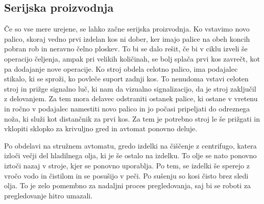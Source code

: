 \subsection{Serijska proizvodnja}
Če so vse mere urejene, se lahko začne serijska proizvodnja.
Ko vstavimo novo palico, skoraj vedno prvi izdelan kos ni dober,
ker imajo palice na obeh koncih pobran rob in neravno čelno ploskev.
To bi se dalo rešit, če bi v ciklu izveli še operacijo čeljenja,
ampak pri velikih količinah, se bolj splača prvi kos zavrečt,
kot pa dodajanje nove operacije. Ko stroj obdela celotno palico,
ima podajalec stikalo, ki se sproži, ko povleče suport zadnji
kos. To nenudoma vstavi celoten stroj in prižge signalno luč,
ki nam da vizualno signalizacijo, da je stroj zaključil z delovanjem.
Za tem mora delavec odstraniti ostanek palice, ki ostane v vretenu
in ročno v podajalec namestiti novo palico in jo počasi pripeljati
do odreznega noža, ki služi kot distančnik za prvi kos. Za tem je
potrebno stroj le še prižgati in vklopiti sklopko za krivuljno gred
in avtomat ponovno deluje.

Po obdelavi na stružnem avtomatu, gredo izdelki na čiščenje z centrifugo,
katera izloči večji del hladilnega olja, ki je še ostalo na izdelku.
To olje se nato ponovno iztoči nazaj v stroje, kjer se ponovno uporablja.
Po tem, se izdelki še sperejo z vročo vodo in čistilom in se posušijo
v peči. Po sušenju so kosi čisto brez sledi olja. To je zelo pomembno
za nadaljni proces pregledovanja, saj bi se roboti za pregledovanje
hitro umazali.